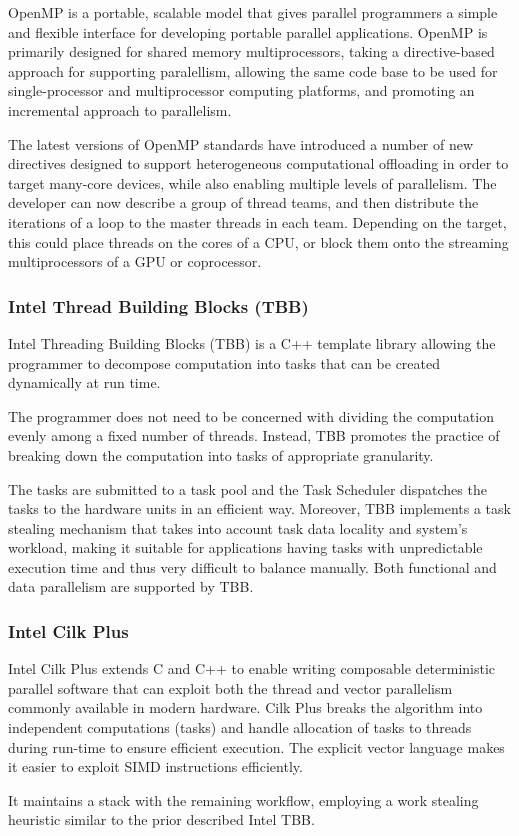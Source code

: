 \documentclass[
  oneside,
  11pt, a4paper,
  footinclude=true,
  headinclude=true,
  cleardoublepage=empty
]{scrbook}
\begin{document}
OpenMP is a portable, scalable model that gives parallel programmers a simple and flexible interface for
developing portable parallel applications. OpenMP is primarily designed for shared memory multiprocessors, taking a directive-based approach for supporting paralellism, allowing the same code base to be used for single-processor and multiprocessor computing platforms, and promoting an incremental approach to parallelism.\par 
The latest versions of OpenMP standards have introduced a number of new directives designed to support heterogeneous computational offloading in order to target many-core devices, while also enabling multiple levels of parallelism. The developer can now describe a group of thread teams, and then distribute the iterations of a loop to the master threads in each team. Depending on the target, this could place threads on the cores of a CPU, or block them onto the streaming multiprocessors of a GPU or coprocessor.

\subsubsection{Intel Thread Building Blocks (TBB)}

Intel Threading Building Blocks (TBB) is a C++ template library allowing the programmer to decompose computation into tasks that can be created dynamically at run time.

The programmer does not need to be concerned with dividing the computation evenly among a fixed number of threads. Instead, TBB promotes the practice of breaking down the computation into tasks of appropriate granularity. \par 
The tasks are submitted to a task pool and the Task Scheduler dispatches the tasks to the hardware units in an efficient way. 
Moreover, TBB implements a task stealing mechanism that takes into account task data locality and
system's workload, making it suitable for applications having tasks with unpredictable execution time and thus very difficult to balance manually. Both functional and data parallelism are supported by TBB.



\subsubsection{Intel Cilk Plus}
Intel Cilk Plus extends C and C++ to enable writing composable deterministic parallel software that can exploit both the thread and vector parallelism commonly available in modern hardware.
Cilk Plus breaks the algorithm into independent computations (tasks)
and handle allocation of tasks to threads during run-time to ensure efficient execution. The explicit vector language makes it easier to exploit SIMD instructions efficiently.\par 
It maintains a stack with
the remaining workflow, employing a work stealing heuristic similar to the prior described Intel TBB.
\end{document}
